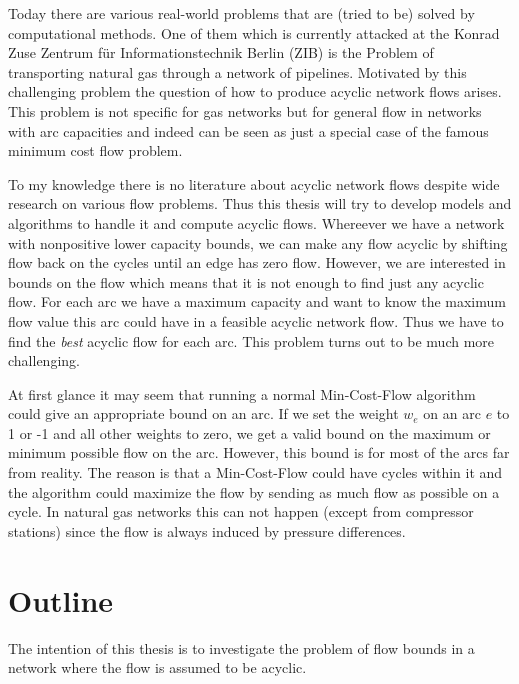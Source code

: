 
Today there are various real-world problems that are (tried to be) solved by computational methods. One of them which 
is currently attacked at the Konrad Zuse Zentrum für Informationstechnik Berlin (ZIB) is the Problem of transporting 
natural gas through a network of pipelines. Motivated by this challenging problem the question of how to produce 
acyclic network flows arises. This problem is not specific for gas networks but for general flow in networks with arc 
capacities and indeed can be seen as just a special case of the famous minimum cost flow problem. 

To my knowledge there is no literature about acyclic network flows despite wide research on various flow problems. 
Thus this thesis will try to develop models and algorithms to handle it and compute acyclic flows.
Whereever we have a network with nonpositive lower capacity bounds, we can make any flow acyclic by shifting flow 
back on the cycles until an edge has zero flow. 
However, we are interested in bounds on the flow which means that it is not enough to find just any acyclic flow. 
For each arc we have a maximum 
capacity and want to know the maximum flow value this arc could have in a feasible acyclic network flow. Thus 
we have to find the \textit{best} acyclic flow for each arc. This problem turns out to be much more challenging.


At first glance it may seem that running a normal Min-Cost-Flow algorithm could give an appropriate bound 
on an arc. If we set the weight $w_e$ on an arc $e$ to 1 or -1 and all other weights to zero, we get 
a valid bound on the maximum or minimum possible flow on the arc. However, this bound is for most of the arcs far from 
reality. The reason is that a Min-Cost-Flow could have cycles within it and the algorithm could maximize the flow by 
sending as much flow as possible on a cycle. In natural gas networks this can not happen (except from compressor 
stations) since the flow is always induced by pressure differences.\\

\section{Outline}
The intention of this thesis is to investigate the problem of flow bounds in a network where the flow is assumed to be 
acyclic. 

